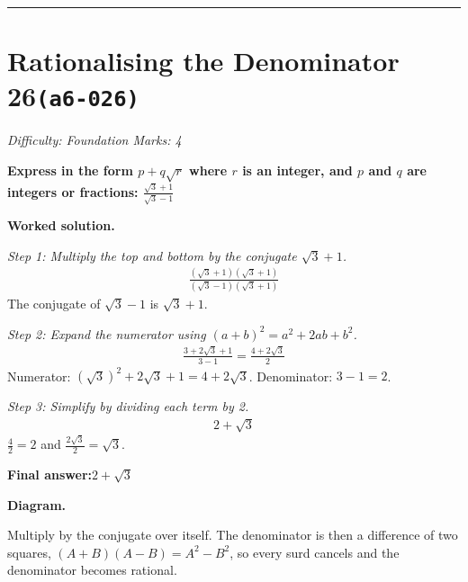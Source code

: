 \documentclass[11pt]{article}
\newcommand{\question}[1]{\par\medskip\noindent\textbf{#1}\par}
\begin{document}
\medskip\hrule

\section*{Rationalising the Denominator 26\quad\small\texttt{(a6-026)}}
\textit{Difficulty: Foundation \quad\textbar\quad Marks: 4}

\question{Express in the form \( p + q\sqrt{r} \) where \( r \) is an integer, and \( p \) and \( q \) are integers or fractions: \( \frac{\sqrt{3} + 1}{\sqrt{3} - 1} \)}

\textbf{Worked solution.}

\textit{Step 1: Multiply the top and bottom by the conjugate \( \sqrt{3} + 1 \).}
\[\begin{gathered}
\frac{(\sqrt{3} + 1)(\sqrt{3} + 1)}{(\sqrt{3} - 1)(\sqrt{3} + 1)}
\end{gathered}\]
The conjugate of \( \sqrt{3} - 1 \) is \( \sqrt{3} + 1 \).

\textit{Step 2: Expand the numerator using \( (a+b)^2 = a^2 + 2ab + b^2 \).}
\[\begin{gathered}
\frac{3 + 2\sqrt{3} + 1}{3 - 1} = \frac{4 + 2\sqrt{3}}{2}
\end{gathered}\]
Numerator: \( (\sqrt{3})^2 + 2\sqrt{3} + 1 = 4 + 2\sqrt{3} \). Denominator: \( 3 - 1 = 2 \).

\textit{Step 3: Simplify by dividing each term by 2.}
\[\begin{gathered}
2 + \sqrt{3}
\end{gathered}\]
\( \frac{4}{2} = 2 \) and \( \frac{2\sqrt{3}}{2} = \sqrt{3} \).

\begin{answerbox}
\textbf{Final answer:}\quad \(\displaystyle 2 + \sqrt{3}\)
\end{answerbox}
\textbf{Diagram.}

\begin{center}
\end{center}
\small Multiply by the conjugate over itself. The denominator is then a difference of two squares, $(A+B)(A-B)=A^{2}-B^{2}$, so every surd cancels and the denominator becomes rational.\normalsize
\end{document}
